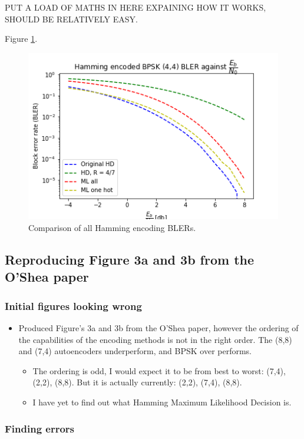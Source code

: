 \documentclass[12pt,onecolumn,letterpaper]{article}
\begin{document}
PUT A LOAD OF MATHS IN HERE EXPAINING HOW IT WORKS, SHOULD BE RELATIVELY EASY.

Figure \ref{fig:HammingBlerAll}.

\begin{figure}
   \centering
   \includegraphics[width=0.6\linewidth]{figures/hamming_7_4_bler_vs_EbNo_comparison.png}
   \caption{Comparison of all Hamming encoding BLERs.}
   \label{fig:HammingBlerAll}
\end{figure}

\subsection{Reproducing Figure 3a and 3b from the O'Shea paper}

\subsubsection{Initial figures looking wrong}

\begin{itemize}
   \item Produced Figure's 3a and 3b from the O'Shea paper, however the ordering of the capabilities of the encoding methods is not in the right order. The (8,8) and (7,4) autoencoders underperform, and BPSK over performs.
   \begin{itemize}
      \item The ordering is odd, I would expect it to be from best to worst: (7,4), (2,2), (8,8). But it is actually currently: (2,2), (7,4), (8,8).
      \item I have yet to find out what Hamming Maximum Likelihood Decision is.
   \end{itemize}
\end{itemize}

\subsubsection{Finding errors}
\end{document}

